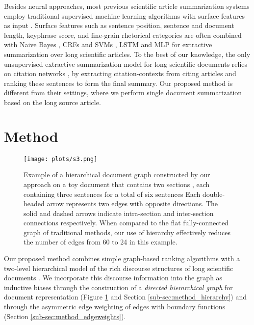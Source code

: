 \documentclass[11pt,a4paper]{article}
\begin{document}
Besides neural approaches, most previous scientific article summarization systems employ traditional supervised machine learning algorithms with surface features as input \citep{xiao2019extractive}. Surface features such as sentence position, sentence and document length, keyphrase score, and fine-grain rhetorical categories are often combined with Naive Bayes \citep{teufel2002summarizing}, CRFs
and SVMs \citep{liakata-etal-2013-discourse}, LSTM and MLP \citep{collins2017supervised} for extractive summarization over long scientific articles. To the best of our knowledge, the only unsupervised extractive summarization model for long scientific documents relies on citation networks \citep{qazvinian-2008-citation-network, cohan-goharian-2015-scientific}, by extracting citation-contexts from citing articles and ranking these sentences to form the final summary. Our proposed method is different from their settings, where we perform single document summarization based on the long source article.




\section{Method}
\begin{figure}[t]
    \centering
    \texttt{[image: plots/s3.png]}
    \caption{Example of a hierarchical document graph constructed by our approach on a toy document that contains two sections , each containing three sentences for a total of six sentences  Each double-headed arrow represents two edges with opposite directions. The solid and dashed arrows indicate intra-section and inter-section connections respectively. When compared to the flat fully-connected graph of traditional methods, our use of hierarchy effectively reduces the number of edges from 60 to 24 in this example. 
    }
    \label{fig:hierarchy}
\end{figure}

Our proposed method combines simple graph-based ranking algorithms with a two-level hierarchical model of the rich discourse structures of long scientific documents \citep{teufel1997sentence,xiao2019extractive}. We incorporate this discourse information into the graph as inductive biases through the construction of a \textit{directed hierarchical graph} for document representation (Figure \ref{fig:hierarchy} and Section \ref{sub-sec:method_hierarchy}) and through the asymmetric edge weighting of edges with boundary functions (Section \ref{sub-sec:method_edgeweights}). 
\end{document}
